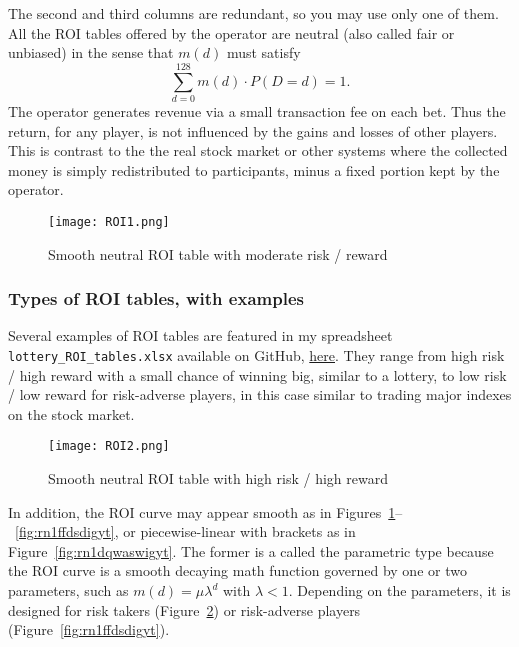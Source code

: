 \documentclass[oneside,10pt]{book}
\begin{document}
\noindent The second and third columns are redundant, so you may use only one of them.
All the ROI tables offered by the operator are neutral (also called fair or unbiased) in the sense that $m(d)$ must satisfy
\begin{equation}
\sum_{d=0}^{128} m(d)\cdot P(D = d) = 1. \label{sapired}
\end{equation}
The operator generates revenue via a small transaction fee on each bet. Thus the return, for any player, is not influenced by the gains and losses of other players. This is contrast to the the real stock market or other systems where the collected money is simply redistributed
 to participants, minus a fixed portion kept by the operator.

\begin{figure}[H]
\centering
\texttt{[image: ROI1.png]}
\caption{Smooth neutral ROI table with moderate risk / reward}
\label{fig:rn1diur44}
\end{figure}

\subsubsection{Types of ROI tables, with examples}

Several examples of ROI tables are featured in my spreadsheet \texttt{lottery\_ROI\_tables.xlsx} available on GitHub,
 \href{https://github.com/VincentGranville/Stochastic-Processes/blob/master/lottery_ROI_tables.xlsx}{here}.
 They range from high risk / high reward with a small chance of winning big, similar to a lottery, to low risk / low reward for risk-adverse players, in this case similar to trading major indexes on the stock market.

\begin{figure}[H]
\centering
\texttt{[image: ROI2.png]}
\caption{Smooth neutral ROI table with high risk / high reward}
\label{fig:rn1digygtf43t}
\end{figure}

 In addition, the ROI curve may appear smooth
 as in Figures~\ref{fig:rn1diur44}--~\ref{fig:rn1ffdsdigyt}, or piecewise-linear with brackets as in Figure~\ref{fig:rn1dqwaswigyt}.
 The former is a called the parametric type because the ROI curve is a smooth decaying math function governed by one
 or two parameters, such as $m(d) = \mu \lambda^{d}$ with $\lambda<1$. Depending on the parameters, it is designed for risk takers (Figure~\ref{fig:rn1digygtf43t}) or risk-adverse
 players (Figure~\ref{fig:rn1ffdsdigyt}).
\end{document}
